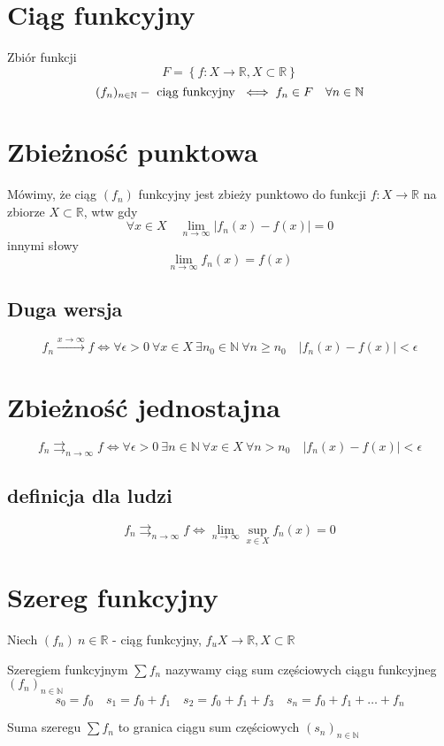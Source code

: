 \documentclass[11pt]{article}
\begin{document}
\section{Ciąg funkcyjny}
Zbiór funkcji
$$ F = \left\{ f : X \to \mathbb{R}, X \subset \mathbb{R} \right\} $$
$$(f_n)_{n \in \mathbb{N}} - \hbox{ ciąg funkcyjny } \iff f_n \in F \quad \forall n \in \mathbb{N} $$

\section{Zbieżność punktowa}
Mówimy, że ciąg $(f_n)$ funkcyjny jest zbieży punktowo do funkcji $f: X \to \mathbb{R}$ na zbiorze $X \subset \mathbb{R}$, wtw gdy $$\forall x \in X \quad \lim_{ n \to \infty}{|f_n(x) - f(x)| = 0}$$
innymi słowy
$$ \lim_{n \to \infty}{f_n(x)} = f(x) $$
\subsection{Duga wersja}
$$ f_n \xrightarrow{x \to \infty} f \iff \forall \epsilon > 0 \ \forall x \in X \ \exists n_0 \in \mathbb{N}\ \forall n \geq n_0 \quad |f_n(x) - f(x)| < \epsilon$$

\section{Zbieżność jednostajna}
$$f_n \mathop{\rightrightarrows}_{n \to \infty} f \iff \forall \epsilon > 0\ \exists n \in \mathbb{N}\ \forall x \in X\ \forall n > n_0\quad |f_n(x) - f(x)| < \epsilon$$
\subsection{definicja dla ludzi}
$$f_n \mathop{\rightrightarrows}_{n \to \infty} f \iff \lim_{n\to \infty}{\sup_{x \in X}{f_n(x)}} = 0$$

\section{Szereg funkcyjny}
Niech $(f_n)\ n \in \mathbb{R}$ - ciąg funkcyjny, $f_u X \to \mathbb{R}, X \subset \mathbb{R}$

Szeregiem funkcyjnym $\sum{f_n}$ nazywamy ciąg sum częściowych ciągu funkcyjneg $(f_n)_{n \in \mathbb{N}}$ 
$$ s_0 = f_0 \quad s_1 = f_0 + f_1 \quad s_2 = f_0 + f_1 + f_3 \quad s_n = f_0 + f_1 + \ldots + f_n $$

Suma szeregu $\sum{f_n}$ to granica ciągu sum częściowych $(s_n)_{n \in \mathbb{N}}$
\end{document}
